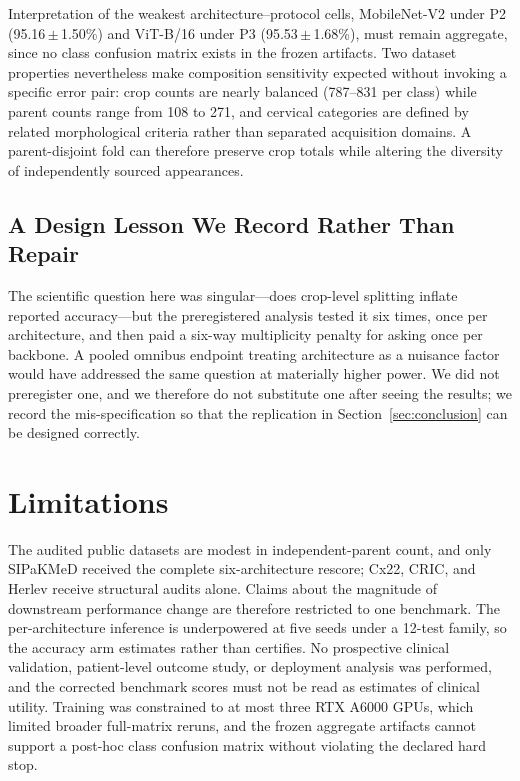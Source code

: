 \documentclass[conference]{IEEEtran}
\newcommand{\meanpm}[2]{#1\,$\pm$\,#2}
\newcommand{\protocol}[1]{\textsf{#1}}
\begin{document}
Interpretation of the weakest architecture--protocol cells, MobileNet-V2 under \protocol{P2} (\meanpm{95.16}{1.50}\%) and ViT-B/16 under \protocol{P3} (\meanpm{95.53}{1.68}\%), must remain aggregate, since no class confusion matrix exists in the frozen artifacts.
Two dataset properties nevertheless make composition sensitivity expected without invoking a specific error pair: crop counts are nearly balanced (787--831 per class) while parent counts range from 108 to 271, and cervical categories are defined by related morphological criteria rather than separated acquisition domains.
A parent-disjoint fold can therefore preserve crop totals while altering the diversity of independently sourced appearances.

\subsection{A Design Lesson We Record Rather Than Repair}
The scientific question here was singular---does crop-level splitting inflate reported accuracy---but the preregistered analysis tested it six times, once per architecture, and then paid a six-way multiplicity penalty for asking once per backbone.
A pooled omnibus endpoint treating architecture as a nuisance factor would have addressed the same question at materially higher power.
We did not preregister one, and we therefore do not substitute one after seeing the results; we record the mis-specification so that the replication in Section~\ref{sec:conclusion} can be designed correctly.

\section{Limitations}
The audited public datasets are modest in independent-parent count, and only SIPaKMeD received the complete six-architecture rescore; Cx22, CRIC, and Herlev receive structural audits alone.
Claims about the magnitude of downstream performance change are therefore restricted to one benchmark.
The per-architecture inference is underpowered at five seeds under a 12-test family, so the accuracy arm estimates rather than certifies.
No prospective clinical validation, patient-level outcome study, or deployment analysis was performed, and the corrected benchmark scores must not be read as estimates of clinical utility.
Training was constrained to at most three RTX A6000 GPUs, which limited broader full-matrix reruns, and the frozen aggregate artifacts cannot support a post-hoc class confusion matrix without violating the declared hard stop.
\end{document}
